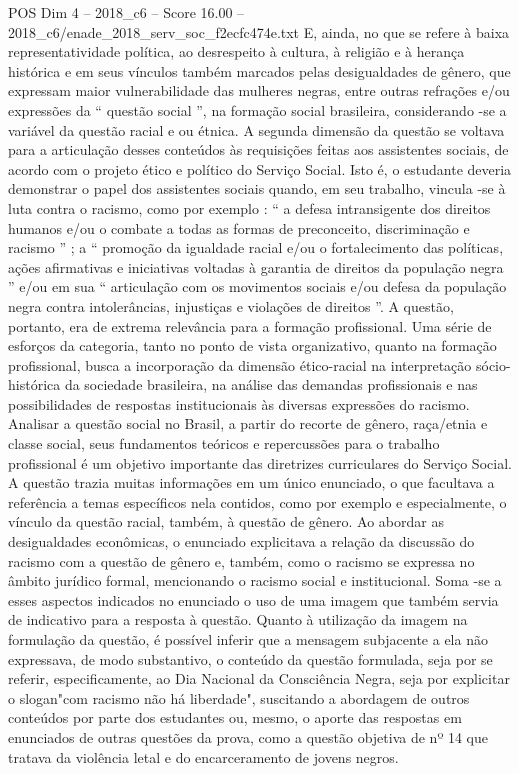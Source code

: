 \begin{textsample}{POS Dim 4 – 2018\_c6 – Score 16.00 – 2018\_c6/enade\_2018\_serv\_soc\_f2ecfc474e.txt}
E, ainda, no que se refere à baixa representatividade política, ao desrespeito à cultura, à religião e à herança histórica e em seus vínculos também marcados pelas desigualdades de gênero, que expressam maior vulnerabilidade das mulheres negras, entre outras refrações e/ou expressões da “ questão social ”, na formação social brasileira, considerando -se a variável da questão racial e ou étnica.
A segunda dimensão da questão se voltava para a articulação desses conteúdos às requisições feitas aos assistentes sociais, de acordo com o projeto ético e político do Serviço Social.
Isto é, o estudante deveria demonstrar o papel dos assistentes sociais quando, em seu trabalho, vincula -se à luta contra o racismo, como por exemplo : “ a defesa intransigente dos direitos humanos e/ou o combate a todas as formas de preconceito, discriminação e racismo ” ; a “ promoção da igualdade racial e/ou o fortalecimento das políticas, ações afirmativas e iniciativas voltadas à garantia de direitos da população negra ” e/ou em sua “ articulação com os movimentos sociais e/ou defesa da população negra contra intolerâncias, injustiças e violações de direitos ”.
A questão, portanto, era de extrema relevância para a formação profissional.
Uma série de esforços da categoria, tanto no ponto de vista organizativo, quanto na formação profissional, busca a incorporação da dimensão ético-racial na interpretação sócio-histórica da sociedade brasileira, na análise das demandas profissionais e nas possibilidades de respostas institucionais às diversas expressões do racismo.
Analisar a questão social no Brasil, a partir do recorte de gênero, raça/etnia e classe social, seus fundamentos teóricos e repercussões para o trabalho profissional é um objetivo importante das diretrizes curriculares do Serviço Social.
A questão trazia muitas informações em um único enunciado, o que facultava a referência a temas específicos nela contidos, como por exemplo e especialmente, o vínculo da questão racial, também, à questão de gênero.
Ao abordar as desigualdades econômicas, o enunciado explicitava a relação da discussão do racismo com a questão de gênero e, também, como o racismo se expressa no âmbito jurídico formal, mencionando o racismo social e institucional.
Soma -se a esses aspectos indicados no enunciado o uso de uma imagem que também servia de indicativo para a resposta à questão.
Quanto à utilização da imagem na formulação da questão, é possível inferir que a mensagem subjacente a ela não expressava, de modo substantivo, o conteúdo da questão formulada, seja por se referir, especificamente, ao Dia Nacional da Consciência Negra, seja por explicitar o slogan"com racismo não há liberdade", suscitando a abordagem de outros conteúdos por parte dos estudantes ou, mesmo, o aporte das respostas em enunciados de outras questões da prova, como a questão objetiva de nº 14 que tratava da violência letal e do encarceramento de jovens negros.

\end{textsample}
